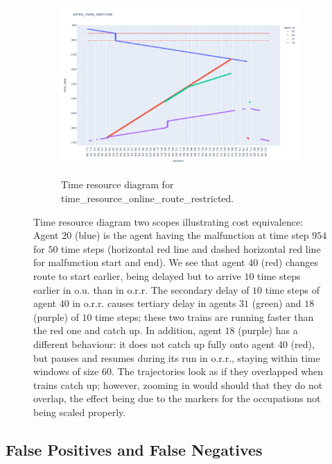 \documentclass{article}
\begin{document}
\begin{figure}
    \begin{subfigure}{\textwidth}
          \includegraphics[width=\textwidth]{Figures/05_use_cases/time_resource_online_route_restricted.pdf}
          \label{fig:cost_equivalence_time_resource_online_unrestricted}
          \caption{Time resource diagram for time\_resource\_online\_route\_restricted.}
     \end{subfigure}
	\caption{Time resource diagram two scopes illustrating cost equivalence: Agent $20$ (blue) is the agent having the malfunction at time step $954$ for $50$ time steps (horizontal red line and dashed horizontal red line for malfunction start and end). We see that agent $40$ (red) changes route to start earlier, being delayed but to arrive $10$ time steps earlier in o.u. than in o.r.r. The secondary delay of $10$ time steps of agent $40$ in o.r.r. causes tertiary delay in agents $31$ (green) and $18$ (purple) of $10$ time steps; these two trains are running faster than the red one and catch up. In addition, agent $18$ (purple) has a different behaviour: it does not catch up fully onto agent $40$ (red), but pauses and resumes during its run in o.r.r., staying within time windows of size $60$. The trajectories look as if they overlapped when trains catch up; however, zooming in would should that they do not overlap, the effect being due to the markers for the occupations not being scaled properly.}
	\label{fig:cost_equivalence_342_time_resource_diagram}
\end{figure}

\subsection{False Positives and False Negatives}
\end{document}
